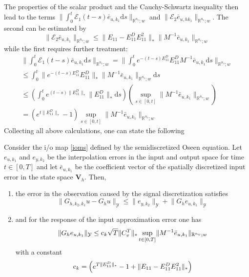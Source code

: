 \documentclass[a4paper,10pt,BCOR=15mm]{scrbook}
\providecommand{\norm}[1]{\lVert#1 \rVert}
\providecommand{\inva}[1]{\text{d} #1}
\begin{document}
The properties of the scalar product and the Cauchy-Schwartz inequality then lead to the terms $ \norm{  \int_0^t \mathscr E_1(t-s)\bar e_{u,k_1}\inva s }_{\mathbb R ^ {n_v};w}$ and  $\norm{ \mathscr E_2 \bar e_{u,hk_1} }_{\mathbb R ^ {n_v};w}$. The second can be estimated by 
\begin{equation*}
 \norm{ \mathscr E_2 \bar e_{u,k_1} }_{\mathbb R ^ {n_v};w} \leq \norm{E_{11} -E_{11}^DE_{11}^2}_* \norm { M^{-1}\bar e_{u,k_1} }_{\mathbb R ^ {n_v};w}
\end{equation*}
while the first requires further treatment:
\begin{align*}
 \norm{  \int_0^t \mathscr E_1(t-s)\bar e_{u,k_1}\inva s }_{\mathbb R ^ {n_v};w} =  \norm{  \int_0^t e^{-(t-s) E_{11}^D}E_{11}^D M^{-1}\bar e_{u,k_1}\inva s }_{\mathbb R ^ {n_v};w} \\
\leq \int_0^t  \norm{  e^{-(t-s) E_{11}^D}E_{11}^D}_* \norm { M^{-1}\bar e_{u,k_1}}_{\mathbb R ^ {n_v};w}\inva s  \\
\leq \left ( \int_0^t  e^{(t-s) \norm{E_{11}^D}_*} \norm {E_{11}^D}_* \inva s \right) \left ( \sup _{s\in [0,t]} \norm { M^{-1}\bar e_{u,k_1}}_{\mathbb R ^ {n_v};w} \right )\\
= \left ( e^{t \norm{E_{11}^D}_*} - 1 \right )  \sup _{s\in [0,t]} \norm { M^{-1}\bar e_{u,k_1}}_{\mathbb R ^ {n_v};w} \quad \quad \quad \quad \quad
\end{align*} 
Collecting all above calculations, one can state the following 
\begin{prop}\label{aper}
 Consider the i/o map \eqref{ioms} defined by the semidiscretized Oseen equation. Let  $e_{u,k_1}$ and $e_{y,k_2}$ be the interpolation errors in the input and output space for time $t\in[0,T]$ and let $\bar e_{u,k_1}$ be the coefficient vector of the spatially discretized input error in the state space $\mathbf V_h$. Then,
\begin{enumerate}
 \item the error in the observation caused by the signal discretization satisfies
\begin{equation*}
 \norm{G_{h,k_2,k_1}u - G_hu}_{\mathcal Y} \leq \norm{e_{y,k_2}}_{\mathcal Y}+\norm{G_{h}e_{u,k_1}}_{\mathcal Y}
\end{equation*}
\item and for the response of the input approximation error one has
\begin{equation*}
 \norm{G_h e_{u,k_1}}_{\mathcal Y} \leq  \text c _k \sqrt T  \norm { C_v^T}_* \sup _{t\in [0,T]} \norm { M^{-1}\bar e_{u,k_1}}_{\mathbb R ^ {n_v};w}
\end{equation*}
with a constant 
\begin{equation*}
\text c _k = \left ( e^{T \norm{E_{11}^D}_*} - 1 + \norm{E_{11} -E_{11}^DE_{11}^2}_* \right ) 
\end{equation*}
\end{enumerate}
\end{prop}
\end{document}
